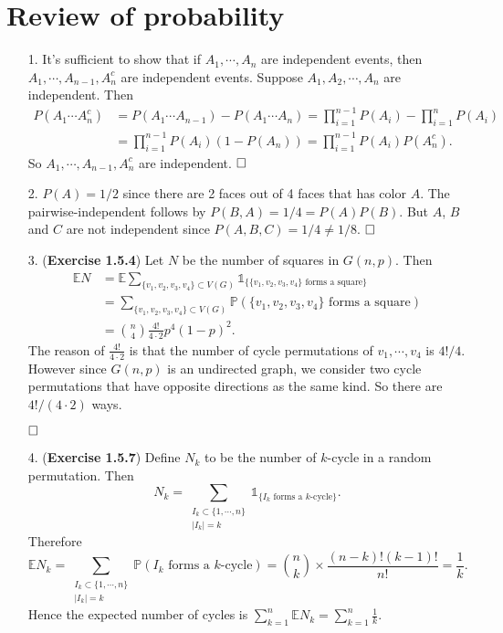 \documentclass[12pt]{extarticle}
\begin{document}
\section*{Review of probability}
\begin{enumerate}
\item[1.] It's sufficient to show that if $A_1,\cdots,A_n$ are independent events, then $A_1,\cdots ,A_{n-1},A_n^c$ are independent events. Suppose $A_1,A_2,\cdots,A_n$ are independent. Then
\[
\begin{aligned}
P(A_1\cdots A_n^c)
&=
P(A_1\cdots A_{n-1})-P(A_1 \cdots A_n)
=\prod_{i=1}^{n-1}P(A_i)-\prod_{i=1}^nP(A_i)
\\&
=
\prod_{i=1}^{n-1}P(A_i)(1-P(A_n))=\prod_{i=1}^{n-1}P(A_i)P(A_n^c).
\end{aligned}
\]
So $A_1,\cdots,A_{n-1},A_n^c$ are independent.
$\hspace{\fill}\square$
\item[2.] $P(A)=1/2$ since there are 2 faces out of 4 faces that has color $A$. The pairwise-independent follows by $P(B,A)=1/4=P(A)P(B)$. But $A$, $B$ and $C$ are not independent since $P(A,B,C)=1/4\neq 1/8$.
$\hspace{\fill}\square$
\item[3.] (\textbf{Exercise 1.5.4}) Let $N$ be the number of squares in $G(n,p)$. Then
\[
\begin{aligned}
\mathbb{E}N &= \mathbb{E}\sum_{\{v_1,v_2,v_3,v_4\}\subset V(G)}\mathds{1}_{\{\{v_1,v_2,v_3,v_4\}\text{ forms a square}\}}
\\&
= \sum_{\{v_1,v_2,v_3,v_4\}\subset V(G)}\mathbb{P}\left(\{v_1,v_2,v_3,v_4\}\text{ forms a square}\right)
\\&
= \binom{n}{4}\frac{4!}{4\cdot 2}p^4(1-p)^2.
\end{aligned}
\]
The reason of $\frac{4!}{4\cdot 2}$ is that the number of cycle permutations of $v_1,\cdots,v_4$ is $4!/4$. However since $G(n,p)$ is an undirected graph, we consider two cycle permutations that have opposite directions as the same kind. So there are $4!/(4\cdot 2)$ ways.

$\hspace{\fill}\square$
\item[4.] (\textbf{Exercise 1.5.7}) Define $N_k$ to be the number of $k$-cycle in a random permutation. Then
\[
N_k=\sum_{\substack{ I_k\subset\{1,\cdots,n\}\\|I_k|=k }}\mathds{1}_{\{\text{$I_k$ forms a $k$-cycle}\}}.
\]
Therefore
\[
\mathbb{E}N_k=\sum_{\substack{ I_k\subset\{1,\cdots,n\}\\|I_k|=k }}
\mathbb{P}(\text{$I_k$ forms a $k$-cycle})
=
\binom{n}{k}\times\frac{(n-k)!(k-1)!}{n!}=\frac{1}{k}.
\]
Hence the expected number of cycles is $\sum_{k=1}^n\mathbb{E}N_k=\sum_{k=1}^n\frac{1}{k}$.


\end{enumerate}
\end{document}
